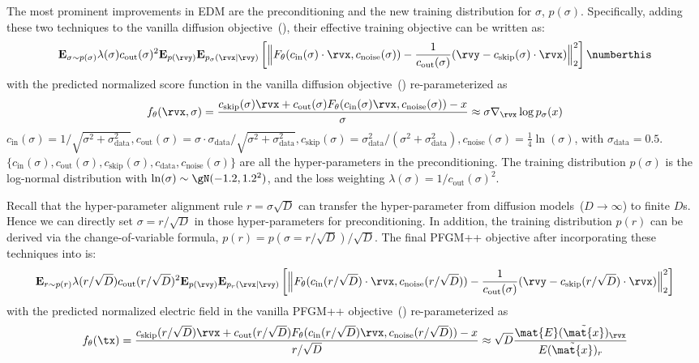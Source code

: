 The most prominent improvements in EDM are the preconditioning and the new training distribution for $\sigma$, \ie $p(\sigma)$. Specifically, adding these two techniques to the vanilla diffusion objective~(), their effective training objective can be written as:
\begin{align*}
    \E_{\sigma \sim p(\sigma)}\lambda(\sigma)c_{\textrm{out}}(\sigma)^2\E_{p({\rvy})}\E_{p_{\sigma}({\rvx}|{\rvy})}\left[\Big\lVert F_{\theta}({c_{\textrm{in}}(\sigma) \cdot \rvx}, c_{\textrm{noise}}(\sigma))- \frac{1}{c_{\textrm{out}}(\sigma)}(\rvy-c_{\textrm{skip}}(\sigma)\cdot \rvx)\Big\rVert_2^2\right] \numberthis \label{eq:edm-obj}
\end{align*}
with the predicted normalized score function in the vanilla diffusion objective~() re-parameterized as 
\begin{align*}
    f_{\theta}(\rvx, \sigma) = \frac{c_{\textrm{skip}}(\sigma)\rvx+c_{\textrm{out}}(\sigma)F_{\theta}({c_{\textrm{in}}(\sigma) \rvx}, c_{\textrm{noise}}(\sigma)) - x}{\sigma} \approx \sigma\nabla_\rvx \log p_\sigma(x)
\end{align*}
$c_{\textrm{in}}(\sigma)=1/\sqrt{\sigma^2+\sigma_{\textrm{data}}^2}, c_{\textrm{out}}(\sigma)=\sigma\cdot\sigma_{\textrm{data}}/\sqrt{\sigma^2+\sigma_{\textrm{data}}^2}, c_{\textrm{skip}}(\sigma)=\sigma_{\textrm{data}}^2/(\sigma^2+\sigma_{\textrm{data}}^2), c_{\textrm{noise}}(\sigma)=\frac14 \ln(\sigma)$, with $\sigma_{\textrm{data}}=0.5$. $\{c_{\textrm{in}}(\sigma),c_{\textrm{out}}(\sigma),c_{\textrm{skip}}(\sigma),c_{\textrm{data}},c_{\textrm{noise}}(\sigma)\}$ are all the hyper-parameters in the preconditioning. The training distribution $p(\sigma)$ is the log-normal distribution with $\ln(\sigma) \sim \gN(-1.2, {1.2}^2)$, and the loss weighting $\lambda(\sigma) = 1/c_{\textrm{out}}(\sigma)^2$. 

Recall that the hyper-parameter alignment rule $r=\sigma\sqrt{D}$ can transfer the hyper-parameter from diffusion models~($D{\to} \infty$) to finite $D$s. Hence we can directly set $\sigma=r/\sqrt{D}$ in those hyper-parameters for preconditioning. In addition, the training distribution $p(r)$ can be derived via the change-of-variable formula, \ie $p(r)=p(\sigma=r/\sqrt{D})/\sqrt{D}$. The final PFGM++ objective after incorporating these techniques into  is:
\begin{align*}
    \E_{r \sim p(r)}\lambda(r/\sqrt{D})c_{\textrm{out}}(r/\sqrt{D})^2\E_{p({\rvy})}\E_{p_{r}({\rvx}|{\rvy})}\left[\Big\lVert F_{\theta}({c_{\textrm{in}}(r/\sqrt{D}) \cdot \rvx}, c_{\textrm{noise}}(r/\sqrt{D}))- \frac{1}{c_{\textrm{out}}(\sigma)}(\rvy-c_{\textrm{skip}}(r/\sqrt{D})\cdot \rvx)\Big\rVert_2^2\right]
\end{align*}
with the predicted normalized electric field in the vanilla PFGM++ objective~() re-parameterized as 
\begin{align*}
    f_{\theta}(\tx) = \frac{c_{\textrm{skip}}(r/\sqrt{D})\rvx+c_{\textrm{out}}(r/\sqrt{D})F_{\theta}({c_{\textrm{in}}(r/\sqrt{D}) \rvx}, c_{\textrm{noise}}(r/\sqrt{D})) - x}{r/\sqrt{D}} \approx {\sqrt{D}}\frac{\mat{E}(\tilde{\mat{x}})_{\rvx}}{E(\tilde{\mat{x}})_{r}}
\end{align*}

